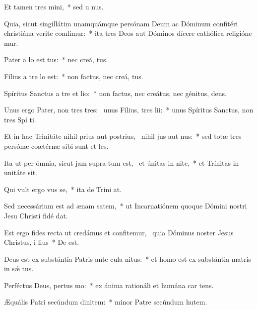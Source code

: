 \item Et tamen  tres mini,~* sed u  nus.
\item Quia, sicut singillátim unamquámque persónam Deum ac Dóminum confitéri christiána verite comlimur:~* ita tres Deos aut Dóminos dícere cathólica religióne mur.
\item Pater a lo est tus:~* nec creá,  tus.
\item Fílius a tre lo est:~* non factus, nec creá,  tus.
\item Spíritus Sanctus a tre et lio:~* non factus, nec creátus, nec génitus,  dens.
\item Unus ergo Pater, non tres tres:~\pscross{} unus Fílius,  tres lii:~* unus Spíritus Sanctus, non tres Spí ti.
\item Et in hac Trinitáte nihil prius aut postrius,~\pscross{} nihil jus aut nus:~* sed totæ tres persónæ coætérnæ sibi sunt et les.
\item Ita ut per ómnia, sicut jam supra tum est,~\pscross{} et únitas in nite,~* et Trínitas in unitáte  sit.
\item Qui vult ergo vus se,~* ita de Trini at.
\item Sed necessárium est ad ænam satem,~* ut Incarnatiónem quoque Dómini nostri Jesu Christi fidé dat.
\item Est ergo fides recta ut credámus et confitemur,~\pscross{} quia Dóminus noster Jesus Christus, i lius~* De   est.
\item Deus est ex substántia Patris ante cula nitus:~* et homo est ex substántia matris in sǽ tus.
\item Perféctus Deus, pertus mo:~* ex ánima rationáli et humána car tens.
\item Æquális Patri secúndum dinitem:~* minor Patre secúndum hutem.
